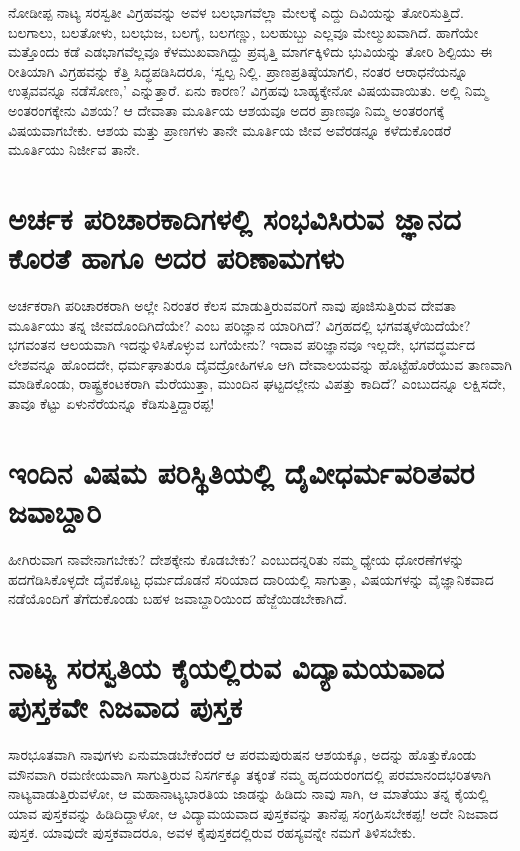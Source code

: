 ನೋಡೀಪ್ಪ ನಾಟ್ಯ ಸರಸ್ವತೀ ವಿಗ್ರಹವನ್ನು ಅವಳ ಬಲಭಾಗವೆಲ್ಲಾ ಮೇಲಕ್ಕೆ ಎದ್ದು ದಿವಿಯನ್ನು ತೋರಿಸುತ್ತಿದೆ. ಬಲಗಾಲು, ಬಲತೋಳು, ಬಲಭುಜ, ಬಲಗೈ, ಬಲಗಣ್ಣು, ಬಲಹುಬ್ಬು ಎಲ್ಲವೂ ಮೇಲ್ಮುಖವಾಗಿದೆ. ಹಾಗೆಯೇ ಮತ್ತೊಂದು ಕಡೆ ಎಡಭಾಗವೆಲ್ಲವೂ ಕೆಳಮುಖವಾಗಿದ್ದು ಪ್ರವೃತ್ತಿ ಮಾರ್ಗಕ್ಕಿಳಿದು ಭುವಿಯನ್ನು ತೋರಿ ಶಿಲ್ಪಿಯು ಈ ರೀತಿಯಾಗಿ ವಿಗ್ರಹವನ್ನು ಕೆತ್ತಿ ಸಿದ್ಧಪಡಿಸಿದರೂ, `ಸ್ವಲ್ಪ ನಿಲ್ಲಿ. ಪ್ರಾಣಪ್ರತಿಷ್ಠೆಯಾಗಲಿ, ನಂತರ ಆರಾಧನೆಯನ್ನೂ ಉತ್ಸವವನ್ನೂ ನಡೆಸೋಣ,' ಎನ್ನುತ್ತಾರೆ. ಏನು ಕಾರಣ? ವಿಗ್ರಹವು ಬಾಹ್ಯಕ್ಕೇನೋ ವಿಷಯವಾಯಿತು. ಅಲ್ಲಿ ನಿಮ್ಮ ಅಂತರಂಗಕ್ಕೇನು ವಿಶಯ? ಆ ದೇವಾತಾ ಮೂರ್ತಿಯ ಆಶಯವೂ ಅದರ ಪ್ರಾಣವೂ ನಿಮ್ಮ ಅಂತರಂಗಕ್ಕೆ ವಿಷಯವಾಗಬೇಕು. ಆಶಯ ಮತ್ತು ಪ್ರಾಣಗಳು ತಾನೇ ಮೂರ್ತಿಯ ಜೀವ ಅವೆರಡನ್ನೂ ಕಳೆದುಕೊಂಡರೆ ಮೂರ್ತಿಯು ನಿರ್ಜೀವ ತಾನೇ.

\section*{ಅರ್ಚಕ ಪರಿಚಾರಕಾದಿಗಳಲ್ಲಿ ಸಂಭವಿಸಿರುವ ಜ್ಞಾನದ ಕೊರತೆ ಹಾಗೂ ಅದರ ಪರಿಣಾಮಗಳು}

ಅರ್ಚಕರಾಗಿ ಪರಿಚಾರಕರಾಗಿ ಅಲ್ಲೇ ನಿರಂತರ ಕೆಲಸ ಮಾಡುತ್ತಿರುವವರಿಗೆ ನಾವು ಪೂಜಿಸುತ್ತಿರುವ ದೇವತಾ ಮೂರ್ತಿಯು ತನ್ನ ಜೀವದೊಂದಿಗಿದೆಯೇ? ಎಂಬ ಪರಿಜ್ಞಾನ ಯಾರಿಗಿದೆ? ವಿಗ್ರಹದಲ್ಲಿ ಭಗವತ್ಕಳೆಯಿದೆಯೇ? ಭಗವಂತನ ಆಲಯವಾಗಿ ಇದನ್ನುಳಿಸಿಕೊಳ್ಳುವ ಬಗೆಯೇನು? ಇದಾವ ಪರಿಜ್ಞಾನವೂ ಇಲ್ಲದೇ, ಭಗವದ್ಧರ್ಮದ ಲೇಶವನ್ನೂ ಹೊಂದದೇ, ಧರ್ಮಘಾತುರೂ ದೈವದ್ರೋಹಿಗಳೂ ಆಗಿ ದೇವಾಲಯವನ್ನು ಹೊಟ್ಟೆಹೊರೆಯುವ ತಾಣವಾಗಿ ಮಾಡಿಕೊಂಡು, ರಾಷ್ಟ್ರಕಂಟಕರಾಗಿ ಮೆರೆಯುತ್ತಾ, ಮುಂದಿನ ಘಟ್ಟದಲ್ಲೇನು ವಿಪತ್ತು ಕಾದಿದೆ? ಎಂಬುದನ್ನೂ ಲಕ್ಷಿಸದೇ, ತಾವೂ ಕೆಟ್ಟು ಏಳುನೆರೆಯನ್ನೂ ಕೆಡಿಸುತ್ತಿದ್ದಾರಪ್ಪ!

\section*{ಇಂದಿನ ವಿಷಮ ಪರಿಸ್ಥಿತಿಯಲ್ಲಿ ದೈವೀಧರ್ಮವರಿತವರ ಜವಾಬ್ದಾರಿ}

ಹೀಗಿರುವಾಗ ನಾವೇನಾಗಬೇಕು? ದೇಶಕ್ಕೇನು ಕೊಡಬೇಕು? ಎಂಬುದನ್ನರಿತು ನಮ್ಮ ಧ್ಯೇಯ ಧೋರಣೆಗಳನ್ನು ಹದಗೆಡಿಸಿಕೊಳ್ಳದೇ ದೈವಕೊಟ್ಟ ಧರ್ಮದೊಡನೆ ಸರಿಯಾದ ದಾರಿಯಲ್ಲಿ ಸಾಗುತ್ತಾ, ವಿಷಯಗಳನ್ನು ವೈಜ್ಞಾನಿಕವಾದ ನಡೆಯೊಂದಿಗೆ ತೆಗೆದುಕೊಂಡು ಬಹಳ ಜವಾಬ್ದಾರಿಯಿಂದ ಹೆಜ್ಜೆಯಿಡಬೇಕಾಗಿದೆ.

\section*{ನಾಟ್ಯ ಸರಸ್ವತಿಯ ಕೈಯಲ್ಲಿರುವ ವಿದ್ಯಾಮಯವಾದ ಪುಸ್ತಕವೇ ನಿಜವಾದ ಪುಸ್ತಕ} 

ಸಾರಭೂತವಾಗಿ ನಾವುಗಳು ಏನುಮಾಡಬೇಕೆಂದರೆ ಆ ಪರಮಪುರುಷನ ಆಶಯಕ್ಕೂ, ಅದನ್ನು ಹೊತ್ತುಕೊಂಡು ಮೌನವಾಗಿ ರಮಣೀಯವಾಗಿ ಸಾಗುತ್ತಿರುವ ನಿಸರ್ಗಕ್ಕೂ ತಕ್ಕಂತೆ ನಮ್ಮ ಹೃದಯರಂಗದಲ್ಲಿ ಪರಮಾನಂದಭರಿತಳಾಗಿ ನಾಟ್ಯವಾಡುತ್ತಿರುವಳೋ, ಆ ಮಹಾನಾಟ್ಯಭಾರತಿಯ ಜಾಡನ್ನು ಹಿಡಿದು ನಾವು ಸಾಗಿ, ಆ ಮಾತೆಯು ತನ್ನ ಕೈಯಲ್ಲಿ ಯಾವ ಪುಸ್ತಕವನ್ನು ಹಿಡಿದಿದ್ದಾಳೋ, ಆ ವಿದ್ಯಾಮಯವಾದ ಪುಸ್ತಕವನ್ನು ತಾನೆಪ್ಪ ಸಂಗ್ರಹಿಸಬೇಕಪ್ಪ! ಅದೇ ನಿಜವಾದ ಪುಸ್ತಕ. ಯಾವುದೇ ಪುಸ್ತಕವಾದರೂ, ಅವಳ ಕೈಪುಸ್ತಕದಲ್ಲಿರುವ ರಹಸ್ಯವನ್ನೇ ನಮಗೆ ತಿಳಿಸಬೇಕು.

